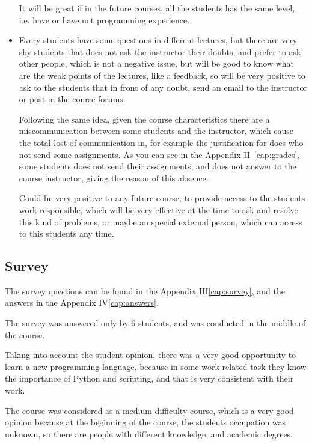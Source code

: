 \documentclass[letter, 10pt]{article}
\begin{document}
\begin{itemize}
          It will be great if in the future courses, all the students
          has the same level, i.e. have or have not programming experience.

    \item Every students have some questions in different lectures,
          but there are very shy students that does not ask the instructor
          their doubts, and prefer to ask other people, which is not
          a negative issue, but will be good to know what are the weak points
          of the lectures, like a feedback, so will be very positive to
          ask to the students that in front of any doubt, send an email
          to the instructor or post in the course forums.

          Following the same idea, given the course characteristics
          there are a miscommunication between some students and the instructor,
          which cause the total lost of communication in, for example
          the justification for does who not send some assignments.
          As you can see in the Appendix II~\ref{cap:grades},
          some students does not send their assignments,
          and does not answer to the course instructor,
          giving the reason of this absence.

          Could be very positive to any future course,
          to provide access to the students work responsible,
          which will be very effective at the time to ask
          and resolve this kind of problems,
          or maybe an special external person,
          which can access to this students any time..
\end{itemize}

\subsection{Survey}

The survey questions can be found in the Appendix III\ref{cap:survey},
and the answers in the Appendix IV\ref{cap:answers}.

The survey was answered only by 6 students,
and was conducted in the middle of the course. 

Taking into account the student opinion,
there was a very good opportunity to learn a new programming language,
because in some work related task they know the importance of Python and scripting,
and that is very consistent with their work.

The course was considered as a medium difficulty course,
which is a very good opinion because at the beginning of the course,
the students occupation was unknown, so there are people with
different knowledge, and academic degrees.
\end{document}
